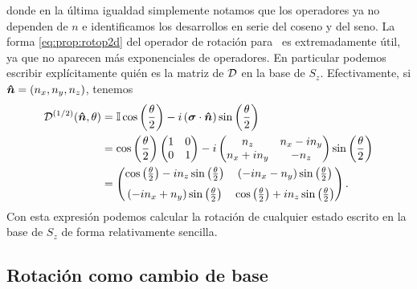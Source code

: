 \documentclass[10pt, a4paper]{article}
\numberwithin{equation}{subsection}
\begin{document}
donde en la última igualdad simplemente notamos que los operadores ya no
dependen de $n$ e identificamos los desarrollos en serie del coseno y del seno.
La forma \eqref{eq:prop:rotop2d} del operador de rotación para \spinhalf~es
extremadamente útil, ya que no aparecen más exponenciales de operadores. En
particular podemos escribir explícitamente quién es la matriz de $\RotationOp$
en la base de $S_z$. Efectivamente, si $\vu*{n} =(n_x, n_y, n_z)$, tenemos
\begin{align}
  \RotationOp[1/2](\vers{n},\theta) &= 
    \Id\cos\left(\frac{\theta}{2}\right)
      -i\left(\vect{\sigma}\cdot\vers{n}\right)\sin\left(\frac{\theta}{2}\right)
      \\
    &= \cos\left(\frac{\theta}{2}\right)
      \begin{pmatrix} 1 & 0 \\ 0 & 1 \end{pmatrix}
      -i\begin{pmatrix} n_z & n_x - in_y \\ n_x + in_y & -n_z\end{pmatrix}
      \sin\left(\frac{\theta}{2}\right) \nonumber \\
    &= \begin{pmatrix}
      \cos\left(\frac{\theta}{2}\right) 
        -in_z\sin\left(\frac{\theta}{2}\right) &
      \left(-in_x - n_y\right)\sin\left(\frac{\theta}{2}\right) \\[0.6em]
      \left(-in_x + n_y\right)\sin\left(\frac{\theta}{2}\right) &
      \cos\left(\frac{\theta}{2}\right) 
        +in_z\sin\left(\frac{\theta}{2}\right)
    \end{pmatrix}.
\end{align}
Con esta expresión podemos calcular la rotación de cualquier estado escrito en
la base de $S_z$ de forma relativamente sencilla.

\subsection{Rotación como cambio de base}
  \label{sec:rotcambiobase}
\end{document}
